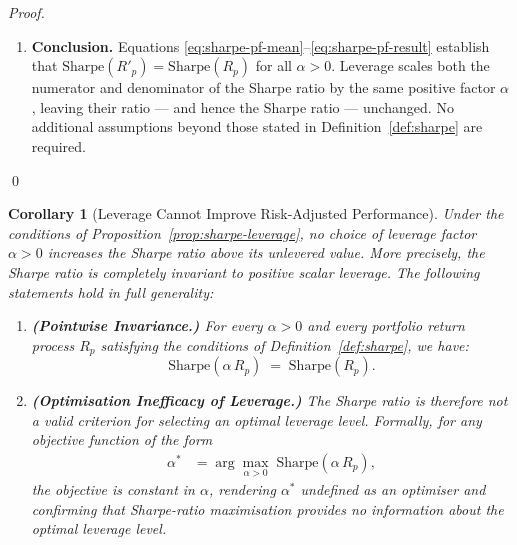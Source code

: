 \documentclass[12pt,openany]{book}
\numberwithin{equation}{chapter}
\theoremstyle{plain}
\newtheorem{corollary}[theorem]{Corollary}
\theoremstyle{definition}
\theoremstyle{remark}
\numberwithin{equation}{chapter}
\theoremstyle{plain}
\begin{document}
\begin{proof}
\begin{enumerate}
  \item \textbf{Conclusion.}
        Equations \eqref{eq:sharpe-pf-mean}--\eqref{eq:sharpe-pf-result}
        establish that $\mathrm{Sharpe}(R'_p) = \mathrm{Sharpe}(R_p)$
        for all $\alpha > 0$.  Leverage scales both the numerator and
        denominator of the Sharpe ratio by the same positive factor
        $\alpha$, leaving their ratio — and hence the Sharpe ratio —
        unchanged.  No additional assumptions beyond those stated in
        Definition~\ref{def:sharpe} are required.
\end{enumerate}
\qed
\end{proof}

\begin{corollary}[Leverage Cannot Improve Risk-Adjusted Performance]
\label{cor:leverage-no-improvement}
Under the conditions of Proposition~\ref{prop:sharpe-leverage},
no choice of leverage factor $\alpha > 0$ increases the Sharpe ratio
above its unlevered value.  More precisely, the Sharpe ratio is
completely invariant to positive scalar leverage.  The following
statements hold in full generality:
\begin{enumerate}
  \item \textbf{(Pointwise Invariance.)}
        For every $\alpha > 0$ and every portfolio return process
        $R_p$ satisfying the conditions of
        Definition~\ref{def:sharpe}, we have:
        \begin{equation}
          \mathrm{Sharpe}(\alpha\,R_p)
            \;=\; \mathrm{Sharpe}(R_p).
          \label{eq:cor-inv}
        \end{equation}

  \item \textbf{(Optimisation Inefficacy of Leverage.)}
        The Sharpe ratio is therefore not a valid criterion for
        selecting an optimal leverage level.  Formally, for any
        objective function of the form
        \begin{align}
          \alpha^{*}
            &= \arg\max_{\alpha > 0}\;
               \mathrm{Sharpe}(\alpha\,R_p),
          \label{eq:cor-opt}
        \end{align}
        the objective is constant in $\alpha$, rendering
        $\alpha^{*}$ undefined as an optimiser and confirming
        that Sharpe-ratio maximisation provides no information
        about the optimal leverage level.


\end{enumerate}
\end{corollary}
\end{document}
